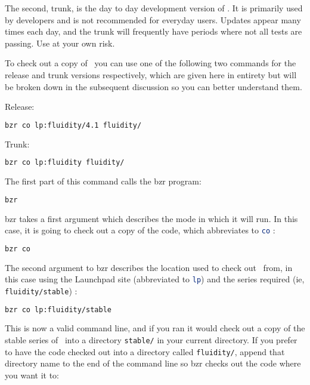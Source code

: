 The second, trunk, is the day to day development version of \fluidity. It is
primarily used by developers and is not recommended for everyday users. Updates
appear many times each day, and the trunk will frequently have periods where
not all tests are passing. Use at your own risk.

To check out a copy of \fluidity\ you can use one of the following two commands
for the release and trunk versions respectively, which are given here in
entirety but will be broken down in the subsequent discussion so you can better
understand them.

Release:
\begin{lstlisting}[language=Bash]
bzr co lp:fluidity/4.1 fluidity/
\end{lstlisting}

Trunk:
\begin{lstlisting}[language=Bash]
bzr co lp:fluidity fluidity/
\end{lstlisting}

The first part of this command calls the bzr program:

\begin{lstlisting}[language=Bash]
bzr
\end{lstlisting}

bzr takes a first argument which describes the mode in which it will run. In
this case, it is going to check out a copy of the code, which abbreviates to
\lstinline[language=Bash]+co+ :

\begin{lstlisting}[language=Bash]
bzr co
\end{lstlisting}

The second argument to bzr describes the location used to check out \fluidity\
from, in this case using the Launchpad site (abbreviated to
\lstinline[language=Bash]+lp+) and the series required (ie,
\lstinline[language=Bash]+fluidity/stable+) :

\begin{lstlisting}[language=Bash]
bzr co lp:fluidity/stable
\end{lstlisting}

This is now a valid command line, and if you ran it would check out a copy of
the stable series of \fluidity\ into a directory
\lstinline[language=Bash]+stable/+ in your current directory. If you
prefer to have the code checked out into a directory called
\lstinline[language=Bash]+fluidity/+, append that directory name to the end of
the command line so bzr checks out the code where you want it to:


